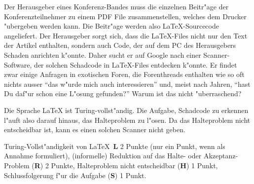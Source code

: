 Der Herausgeber eines Konferenz-Bandes muss die einzelnen Beitr"age der 
Konferenzteilnehmer zu einem PDF File zusammenstellen, welches dem Drucker
"ubergeben werden kann.
Die Beitr"age werden also \LaTeX-Sourcecode angeliefert.
Der Herausgeber sorgt sich, dass die \LaTeX-Files nicht nur den Text
der Artikel enthalten, sondern auch Code, der auf dem PC des Herausgebers
Schaden anrichten k"onnte.
Daher sucht er auf Google nach einer Scanner-Software, der solchen Schadcode  in
\LaTeX-Files entdecken k"onnte.
Er findet zwar einige Anfragen in exotischen Foren, die Forenthreads
enthalten wie so oft nichts ausser ``das w"urde mich auch interessieren'' und,
meist nach Jahren, ``hast Du daf"ur schon eine L"osung gefunden?''
Warum ist das nicht "uberraschend?

\begin{loesung}
Die Sprache \LaTeX{} ist Turing-vollst"andig.
Die Aufgabe, Schadcode zu erkennen l"auft also darauf hinaus, das Halteproblem
zu l"osen.
Da das Halteproblem nicht entscheidbar ist, kann es einen solchen Scanner
nicht geben.
\end{loesung}

\begin{bewertung}
Turing-Vollst"andigkeit von \LaTeX~{\bf L} 2 Punkte (nur ein Punkt, wenn
als Annahme formuliert),
(informelle) Reduktion auf das Halte- oder Akzeptanz-Problem ({\bf R}) 2 Punkte,
Halteproblem nicht entscheidbar ({\bf H}) 1 Punkt,
Schlussfolgerung f"ur die Aufgabe ({\bf S}) 1 Punkt.
\end{bewertung}

